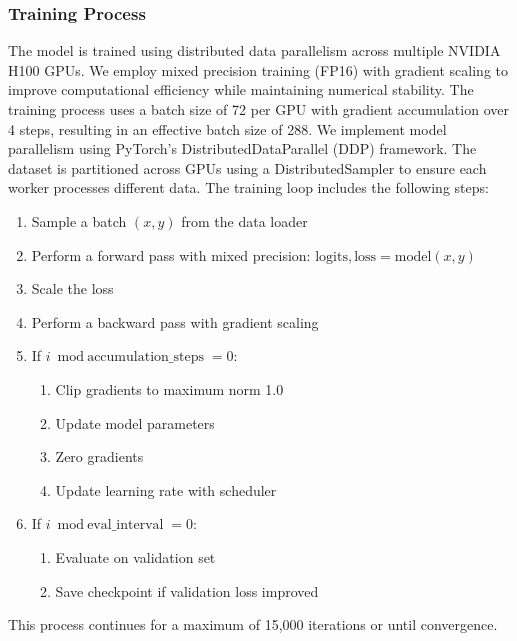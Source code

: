 \subsubsection{Training Process}
The model is trained using distributed data parallelism across multiple NVIDIA H100 GPUs. We employ mixed precision training (FP16) with gradient scaling to improve computational efficiency while maintaining numerical stability. The training process uses a batch size of 72 per GPU with gradient accumulation over 4 steps, resulting in an effective batch size of 288.
We implement model parallelism using PyTorch's DistributedDataParallel (DDP) framework. The dataset is partitioned across GPUs using a DistributedSampler to ensure each worker processes different data. The training loop includes the following steps:
\begin{enumerate}
    \item Sample a batch $(x, y)$ from the data loader
    \item Perform a forward pass with mixed precision: $\text{logits}, \text{loss} = \text{model}(x, y)$
    \item Scale the loss
    \item Perform a backward pass with gradient scaling
    \item If $i \bmod \text{accumulation\_steps} = 0$:
    \begin{enumerate}
        \item Clip gradients to maximum norm 1.0
        \item Update model parameters
        \item Zero gradients
        \item Update learning rate with scheduler
    \end{enumerate}
    \item If $i \bmod \text{eval\_interval} = 0$:
    \begin{enumerate}
        \item Evaluate on validation set
        \item Save checkpoint if validation loss improved
    \end{enumerate}
\end{enumerate}
\noindent This process continues for a maximum of 15,000 iterations or until convergence.
